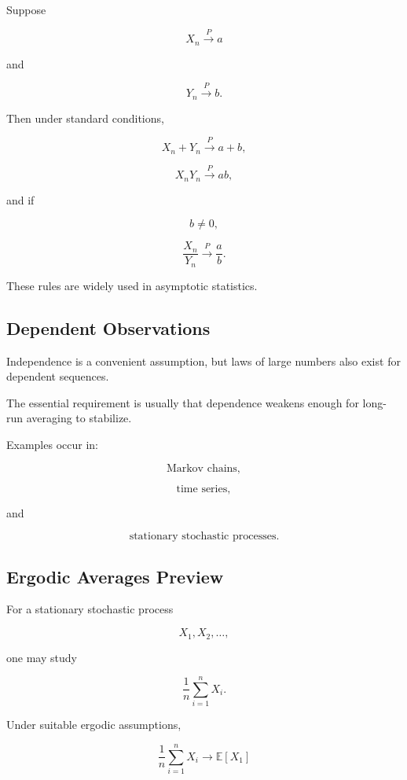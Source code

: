 Suppose

\[
X_n
\xrightarrow{P}
a
\]

and

\[
Y_n
\xrightarrow{P}
b.
\]

Then under standard conditions,

\[
\boxed{
X_n+Y_n
\xrightarrow{P}
a+b,
}
\]

\[
\boxed{
X_nY_n
\xrightarrow{P}
ab,
}
\]

and if

\[
b\neq0,
\]

\[
\boxed{
\frac{X_n}{Y_n}
\xrightarrow{P}
\frac{a}{b}.
}
\]

These rules are widely used in asymptotic statistics.

\subsection{Dependent Observations}
\label{subsec:dependent-observations-lln}

Independence is a convenient assumption, but laws of large numbers also
exist for dependent sequences.

The essential requirement is usually that dependence weakens enough for
long-run averaging to stabilize.

Examples occur in:

\[
\text{Markov chains},
\]

\[
\text{time series},
\]

and

\[
\text{stationary stochastic processes}.
\]

\subsection{Ergodic Averages Preview}
\label{subsec:ergodic-averages-preview}

For a stationary stochastic process

\[
X_1,X_2,\ldots,
\]

one may study

\[
\frac1n
\sum_{i=1}^{n}X_i.
\]

Under suitable ergodic assumptions,

\[
\boxed{
\frac1n
\sum_{i=1}^{n}X_i
\to
\mathbb{E}[X_1]
}
\]

